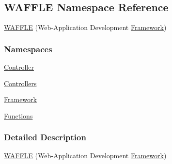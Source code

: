 \hypertarget{namespace_w_a_f_f_l_e}{}\subsection{W\+A\+F\+F\+LE Namespace Reference}
\label{namespace_w_a_f_f_l_e}


\hyperlink{namespace_w_a_f_f_l_e}{W\+A\+F\+F\+LE} (Web-\/\+Application Development \hyperlink{namespace_w_a_f_f_l_e_1_1_framework}{Framework})  


\subsubsection*{Namespaces}
\begin{DoxyCompactItemize}
\item 
 \hyperlink{namespace_w_a_f_f_l_e_1_1_controller}{Controller}
\item 
 \hyperlink{namespace_w_a_f_f_l_e_1_1_controllers}{Controllers}
\item 
 \hyperlink{namespace_w_a_f_f_l_e_1_1_framework}{Framework}
\item 
 \hyperlink{namespace_w_a_f_f_l_e_1_1_functions}{Functions}
\end{DoxyCompactItemize}


\subsubsection{Detailed Description}
\hyperlink{namespace_w_a_f_f_l_e}{W\+A\+F\+F\+LE} (Web-\/\+Application Development \hyperlink{namespace_w_a_f_f_l_e_1_1_framework}{Framework}) 